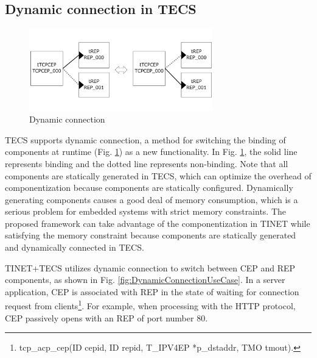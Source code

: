 \documentclass[conference]{IEEEtran/IEEEtran}
\begin{document}


\subsection{Dynamic connection in TECS}
\label{sec:DynamicConnection}

\begin{figure}[t]
    \centering
    \includegraphics[width=8.0cm,clip]{figure/DynamicConnection.pdf}
    \vspace{-1mm} \caption{Dynamic connection}
    \vspace{-1mm} \label{fig:DynamicConnection}
\end{figure}

TECS supports dynamic connection, a method for switching the binding of components at runtime (Fig. \ref{fig:DynamicConnection}) as a new functionality.
In Fig. \ref{fig:DynamicConnection}, the solid line represents binding and the dotted line represents non-binding.
Note that all components are statically generated in TECS, which can optimize the overhead of componentization because components are statically configured.
Dynamically generating components causes a good deal of memory consumption, which is a serious problem for embedded systems with strict memory constraints.
The proposed framework can take advantage of the componentization in TINET while satisfying the memory constraint because components are statically generated and dynamically connected in TECS.

TINET+TECS utilizes dynamic connection to switch between CEP and REP components, as shown in Fig. \ref{fig:DynamicConnectionUseCase}.
In a server application, CEP is associated with REP in the state of waiting for connection request from clients\footnote{tcp\_acp\_cep(ID cepid, ID repid, T\_IPV4EP *p\_dstaddr, TMO tmout).}.
For example, when processing with the HTTP protocol, CEP passively opens with an REP of port number 80.
\end{document}
